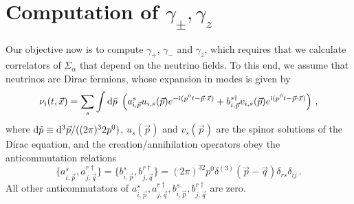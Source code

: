 \documentclass[aps,prd,10pt,twocolumn,superscriptaddress,floatfix,nofootinbib,amsmath,amssymb,altaffilletter,preprintnumbers]{revtex4-1}
\begin{document}

\section{Computation of \texorpdfstring{$\gamma_{\pm},\gamma_z$}{gamma+-,gammaz}}\label{app:gammas}

Our objective now is to compute $\gamma_{+}$, $\gamma_{-}$ and $\gamma_{z}$, which requires that we calculate correlators of $\Sigma_\alpha$ that depend on the neutrino fields. To this end, we assume that neutrinos are Dirac fermions, whose expansion in modes is given by
\begin{equation}
    \nu_i(t,\vec{x})= \sum_s \int {\rm d}\tilde{p} \; \left(a^s_{{\rm i},\vec{p}}u_{i,s}(\vec{p})e^{-{\rm i}(p^0 t-\vec{p}\cdot\vec{x})}+b^{s \dag}_{i,\vec{p}}v_{i,s}(\vec{p})e^{{\rm i} (p^0t-\vec{p}\cdot\vec{x})}\right)\, ,
    \label{modes}
\end{equation}
where ${\rm d}\tilde{p}\equiv {\rm d}^3\vec{p}/((2\pi)^32p^0)$, $u_s(\vec{p})$ and $v_s(\vec{p})$ are the spinor solutions of the Dirac equation, and the creation/annihilation operators obey the anticommutation relations
\begin{equation}
   \{a^s_{i,\vec{p}},a^{r \dag}_{j,\vec{q}}\}=\{b^s_{i,\vec{p}},b^{r \dag}_{j,\vec{q}}\}=(2\pi)^32p^0\delta^{(3)}(\vec{p}-\vec{q})\delta_{rs}\delta_{ij}\,.
   \label{anticom}
\end{equation}
All other anticommutators of $a^s_{i,\vec{p}}, a^{r \dag}_{j,\vec{q}},b^s_{i,\vec{p}},b^{r \dag}_{j,\vec{q}}$ are zero.
\end{document}
